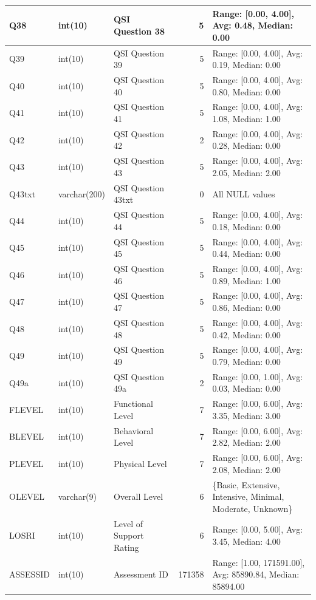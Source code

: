 \begin{landscape}
\begin{longtable}{|l|l|l|r|p{6cm}|}
\hline
Q38 & int(10) & QSI Question 38 & 5 & Range: [0.00, 4.00], Avg: 0.48, Median: 0.00 \\
\hline
Q39 & int(10) & QSI Question 39 & 5 & Range: [0.00, 4.00], Avg: 0.19, Median: 0.00 \\
\hline
Q40 & int(10) & QSI Question 40 & 5 & Range: [0.00, 4.00], Avg: 0.80, Median: 0.00 \\
\hline
Q41 & int(10) & QSI Question 41 & 5 & Range: [0.00, 4.00], Avg: 1.08, Median: 1.00 \\
\hline
Q42 & int(10) & QSI Question 42 & 2 & Range: [0.00, 4.00], Avg: 0.28, Median: 0.00 \\
\hline
Q43 & int(10) & QSI Question 43 & 5 & Range: [0.00, 4.00], Avg: 2.05, Median: 2.00 \\
\hline
Q43txt & varchar(200) & QSI Question 43txt & 0 & All NULL values \\
\hline
Q44 & int(10) & QSI Question 44 & 5 & Range: [0.00, 4.00], Avg: 0.18, Median: 0.00 \\
\hline
Q45 & int(10) & QSI Question 45 & 5 & Range: [0.00, 4.00], Avg: 0.44, Median: 0.00 \\
\hline
Q46 & int(10) & QSI Question 46 & 5 & Range: [0.00, 4.00], Avg: 0.89, Median: 1.00 \\
\hline
Q47 & int(10) & QSI Question 47 & 5 & Range: [0.00, 4.00], Avg: 0.86, Median: 0.00 \\
\hline
Q48 & int(10) & QSI Question 48 & 5 & Range: [0.00, 4.00], Avg: 0.42, Median: 0.00 \\
\hline
Q49 & int(10) & QSI Question 49 & 5 & Range: [0.00, 4.00], Avg: 0.79, Median: 0.00 \\
\hline
Q49a & int(10) & QSI Question 49a & 2 & Range: [0.00, 1.00], Avg: 0.03, Median: 0.00 \\
\hline
FLEVEL & int(10) & Functional Level & 7 & Range: [0.00, 6.00], Avg: 3.35, Median: 3.00 \\
\hline
BLEVEL & int(10) & Behavioral Level & 7 & Range: [0.00, 6.00], Avg: 2.82, Median: 2.00 \\
\hline
PLEVEL & int(10) & Physical Level & 7 & Range: [0.00, 6.00], Avg: 2.08, Median: 2.00 \\
\hline
OLEVEL & varchar(9) & Overall Level & 6 & \{Basic, Extensive, Intensive, Minimal, Moderate, Unknown\} \\
\hline
LOSRI & int(10) & Level of Support Rating & 6 & Range: [0.00, 5.00], Avg: 3.45, Median: 4.00 \\
\hline
ASSESSID & int(10) & Assessment ID & 171358 & Range: [1.00, 171591.00], Avg: 85890.84, Median: 85894.00 \\
\hline
\end{longtable}


\end{landscape}
